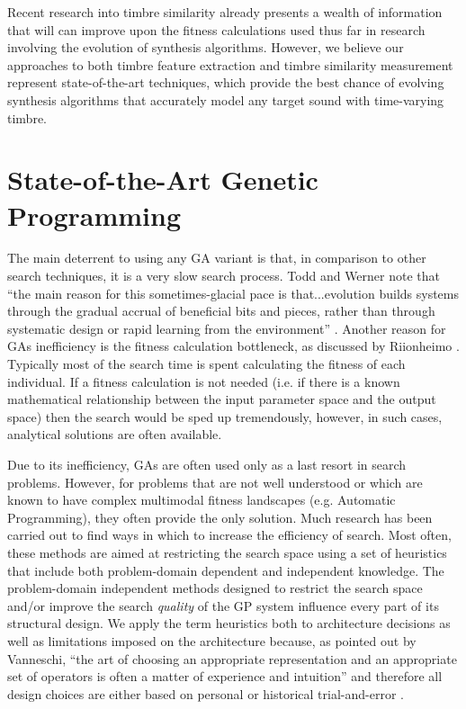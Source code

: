 \documentclass[a4paper,12pt]{report} 	%
\numberwithin{figure}{chapter}
\numberwithin{table}{chapter}
\numberwithin{equation}{chapter}
\begin{document}
\begin{flushleft}
Recent research into timbre similarity already presents a wealth of information that will can improve upon the fitness calculations used thus far in research involving the evolution of synthesis algorithms. However, we believe our approaches to both timbre feature extraction and timbre similarity measurement represent state-of-the-art techniques, which provide the best chance of evolving synthesis algorithms that accurately model any target sound with time-varying timbre.

\section{State-of-the-Art Genetic Programming}

The main deterrent to using any GA variant is that, in comparison to other search techniques, it is a very slow search process. Todd and Werner note that ``the main reason for this sometimes-glacial pace is that...evolution builds systems through the gradual accrual of beneficial bits and pieces, rather than through systematic design or rapid learning from the environment'' \cite[p. 5]{Todd:1998t}. Another reason for GAs inefficiency is the fitness calculation bottleneck, as discussed by Riionheimo \cite[p.10]{Riionheimo:2003qo}. Typically most of the search time is spent calculating the fitness of each individual. If a fitness calculation is not needed (i.e. if there is a known mathematical relationship between the input parameter space and the output space) then the search would be sped up tremendously, however, in such cases, analytical solutions are often available.

Due to its inefficiency, GAs are often used only as a last resort in search problems. However, for problems that are not well understood or which are known to have complex multimodal fitness landscapes (e.g. Automatic Programming), they often provide the only solution. Much research has been carried out to find ways in which to increase the efficiency of search. Most often, these methods are aimed at restricting the search space using a set of heuristics that include both problem-domain dependent and independent knowledge. The problem-domain independent methods designed to restrict the search space and/or improve the search \emph{quality} of the GP system influence every part of its structural design. We apply the term heuristics both to architecture decisions as well as limitations imposed on the architecture because, as pointed out by Vanneschi, ``the art of choosing an appropriate representation and an appropriate set of operators is often a matter of experience and intuition'' and therefore all design choices are either based on personal or historical trial-and-error \cite[p. 6]{Vanneschi:2004le}.


\end{flushleft}
\end{document}
